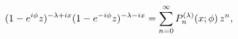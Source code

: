 \[(1-e^{i\phi}z)^{-\lambda+ix}(1-e^{-i\phi}z)^{-\lambda-ix}=\sum_{n=0}^{\infty}%
\mathop{P^{(\lambda)}_{n}\/}\nolimits\!\left(x;\phi\right)z^{n},\]